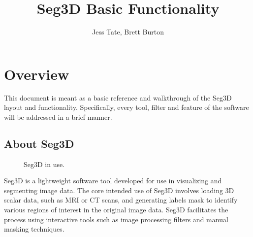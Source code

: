 \documentclass[fleqn,11pt,openany]{book}
\title{Seg3D Basic Functionality}
\author{Jess Tate, Brett Burton}
\begin{document}


\maketitle


\chapter{Overview}

\begin{introduction}

This document is meant as a basic reference and walkthrough of the Seg3D layout and functionality.  Specifically, every tool, filter and feature of the software will be addressed in a brief manner.  

\end{introduction}

\section{About Seg3D}

\begin{figure}
\caption{Seg3D in use.}\label{fig:layout}
\end{figure}

Seg3D is a lightweight software tool developed for use in visualizing and segmenting image data.  The core intended use of Seg3D involves loading 3D scalar data, such as MRI or CT scans, and generating labels mask to identify various regions of interest in the original image data.  Seg3D facilitates the process using interactive tools such as image processing filters and manual masking techniques.  
\end{document}
